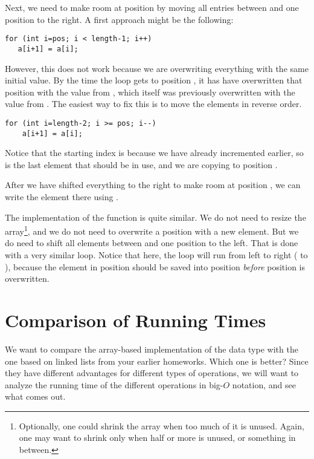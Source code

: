 Next, we need to make room at position  by moving all
entries between  and  one position to the right.
A first approach might be the following:

\begin{verbatim}
for (int i=pos; i < length-1; i++) 
   a[i+1] = a[i];
\end{verbatim}

However, this does not work because we are overwriting everything with
the same initial value. By the time the loop gets to position ,
it has have overwritten that position with the value from ,
which itself was previously overwritten with the value from .
The easiest way to fix this is to move the elements in reverse order.
\begin{verbatim}
for (int i=length-2; i >= pos; i--)      
    a[i+1] = a[i];
\end{verbatim}
Notice that the starting index is  because we have
already incremented  earlier,
so  is the last element that should be in use,
and we are copying to position . 
 
After we have shifted everything to the right to make room at position
, we can write the element there using .

\medskip

The implementation of the  function is quite similar. We
do not need to resize the array\footnote{Optionally, one could shrink
  the array when too much of it is unused. Again, one may want to
  shrink only when half or more is unused, or something in between.}, 
and we do not need to overwrite a position with a new element. 
But we do need to shift all elements between  and
 one position to the left.
That is done with a very similar loop. Notice that here, the loop will
run from left to right ( to ), because the
element in position  should be saved into position 
\emph{before} position  is overwritten.

\section{Comparison of Running Times}
We want to compare the array-based implementation of the 
data type with the one based on linked lists from your earlier
homeworks.
Which one is better?
Since they have different advantages for different types of operations,
we will want to analyze the running time of the different operations
in big-$O$ notation, and see what comes out.

